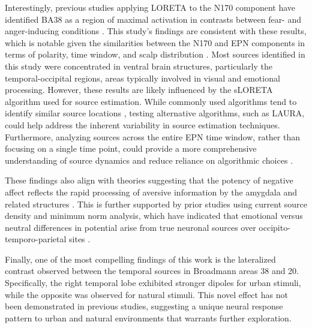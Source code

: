 Interestingly, previous studies applying LORETA to the N170 component have identified BA38 as a region of maximal activation in contrasts between fear- and anger-inducing conditions \cite{tsolakiAgeinducedDifferencesBrain2017}. This study’s findings are consistent with these results, which is notable given the similarities between the N170 and EPN components in terms of polarity, time window, and scalp distribution \cite{luckOxfordHandbookEventrelated2013}. Most sources identified in this study were concentrated in ventral brain structures, particularly the temporal-occipital regions, areas typically involved in visual and emotional processing. However, these results are likely influenced by the sLORETA algorithm used for source estimation. While commonly used algorithms tend to identify similar source locations \cite{shiraziMoreReliableEEG2019}, testing alternative algorithms, such as LAURA, could help address the inherent variability in source estimation techniques. Furthermore, analyzing sources across the entire EPN time window, rather than focusing on a single time point, could provide a more comprehensive understanding of source dynamics and reduce reliance on algorithmic choices \cite{mahjooryConsistencyEEGSource2017}.

These findings also align with theories suggesting that the potency of negative affect reflects the rapid processing of aversive information by the amygdala and related structures \cite{rozenkrantsAffectiveERPProcessing2008}. This is further supported by prior studies using current source density and minimum norm analysis, which have indicated that emotional versus neutral differences in potential arise from true neuronal sources over occipito-temporo-parietal sites \cite{schuppStimulusNoveltyEmotion2006, junghoferFleetingImagesNew2001}.

Finally, one of the most compelling findings of this work is the lateralized contrast observed between the temporal sources in Broadmann areas 38 and 20. Specifically, the right temporal lobe exhibited stronger dipoles for urban stimuli, while the opposite was observed for natural stimuli. This novel effect has not been demonstrated in previous studies, suggesting a unique neural response pattern to urban and natural environments that warrants further exploration.


